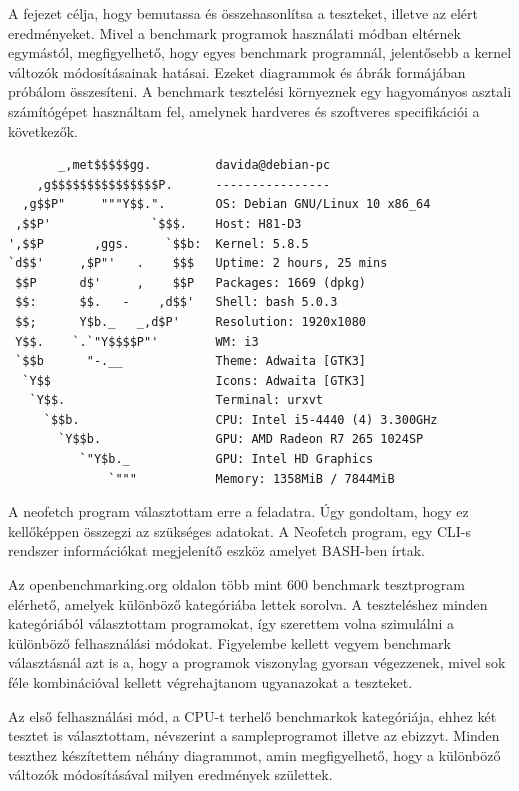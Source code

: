 
A fejezet célja, hogy bemutassa és összehasonlítsa a teszteket, illetve az elért eredményeket. Mivel a benchmark programok használati módban eltérnek egymástól, megfigyelhető, hogy egyes benchmark programnál, jelentősebb a kernel változók módosításainak hatásai.
Ezeket diagrammok és ábrák formájában próbálom összesíteni.
A benchmark tesztelési környeznek egy hagyományos asztali számítógépet használtam fel, amelynek hardveres és szoftveres specifikációi a következők.

\begin{lstlisting}
       _,met$$$$$gg.         davida@debian-pc 
    ,g$$$$$$$$$$$$$$$P.      ---------------- 
  ,g$$P"     """Y$$.".       OS: Debian GNU/Linux 10 x86_64 
 ,$$P'              `$$$.    Host: H81-D3 
',$$P       ,ggs.     `$$b:  Kernel: 5.8.5 
`d$$'     ,$P"'   .    $$$   Uptime: 2 hours, 25 mins 
 $$P      d$'     ,    $$P   Packages: 1669 (dpkg) 
 $$:      $$.   -    ,d$$'   Shell: bash 5.0.3 
 $$;      Y$b._   _,d$P'     Resolution: 1920x1080 
 Y$$.    `.`"Y$$$$P"'        WM: i3 
 `$$b      "-.__             Theme: Adwaita [GTK3] 
  `Y$$                       Icons: Adwaita [GTK3] 
   `Y$$.                     Terminal: urxvt 
     `$$b.                   CPU: Intel i5-4440 (4) 3.300GHz 
       `Y$$b.                GPU: AMD Radeon R7 265 1024SP 
          `"Y$b._            GPU: Intel HD Graphics 
              `"""           Memory: 1358MiB / 7844MiB
\end{lstlisting}
A neofetch program választottam erre a feladatra. Úgy gondoltam, hogy ez kellőképpen összegzi az szükséges adatokat. A Neofetch program, egy CLI-s rendszer információkat megjelenítő eszköz amelyet BASH-ben írtak.


Az openbenchmarking.org oldalon több mint 600 benchmark tesztprogram elérhető, amelyek különböző kategóriába lettek sorolva. A teszteléshez minden kategóriából választottam programokat, így szerettem volna szimulálni a különböző felhasználási módokat. Figyelembe kellett vegyem benchmark választásnál azt is a, hogy a programok viszonylag gyorsan végezzenek, mivel sok féle kombinációval kellett végrehajtanom ugyanazokat a teszteket. 


Az első felhasználási mód, a CPU-t terhelő benchmarkok kategóriája, ehhez két tesztet is választottam, névszerint a sampleprogramot illetve az ebizzyt.
Minden teszthez készítettem néhány diagrammot, amin megfigyelhető, hogy a különböző változók módosításával milyen eredmények születtek.

